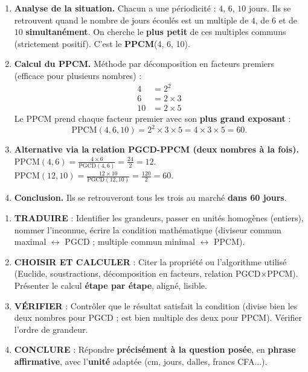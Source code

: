 \documentclass[11pt]{article}
\begin{document}
\begin{enumerate}
\item \textbf{Analyse de la situation.}
Chacun a une périodicité : $4$, $6$, $10$ jours. Ils se retrouvent quand le nombre de jours écoulés est un multiple de $4$, de $6$ et de $10$ \textbf{simultanément}. On cherche le \textbf{plus petit} de ces multiples communs (strictement positif). C'est le \textbf{PPCM}(4, 6, 10).

\item \textbf{Calcul du PPCM.}
Méthode par décomposition en facteurs premiers (efficace pour plusieurs nombres) :
\begin{align*}
4 &= 2^2 \\
6 &= 2 \times 3 \\
10 &= 2 \times 5
\end{align*}
Le PPCM prend chaque facteur premier avec son \textbf{plus grand exposant} :
\[
\text{PPCM}(4,6,10) = 2^2 \times 3 \times 5 = 4 \times 3 \times 5 = 60.
\]

\item \textbf{Alternative via la relation PGCD-PPCM (deux nombres à la fois).}
$\text{PPCM}(4,6) = \frac{4\times6}{\text{PGCD}(4,6)} = \frac{24}{2} = 12$.
$\text{PPCM}(12,10) = \frac{12\times10}{\text{PGCD}(12,10)} = \frac{120}{2} = 60$.

\item \textbf{Conclusion.}
Ils se retrouveront tous les trois au marché \textbf{dans 60 jours}.
\end{enumerate}

\begin{methode}
\begin{enumerate}
\item \textbf{TRADUIRE} : Identifier les grandeurs, passer en unités homogènes (entiers), nommer l'inconnue, écrire la condition mathématique (diviseur commun maximal $\leftrightarrow$ PGCD ; multiple commun minimal $\leftrightarrow$ PPCM).
\item \textbf{CHOISIR ET CALCULER} : Citer la propriété ou l'algorithme utilisé (Euclide, soustractions, décomposition en facteurs, relation PGCD$\times$PPCM). Présenter le calcul \textbf{étape par étape}, aligné, lisible.
\item \textbf{VÉRIFIER} : Contrôler que le résultat satisfait la condition (divise bien les deux nombres pour PGCD ; est bien multiple des deux pour PPCM). Vérifier l'ordre de grandeur.
\item \textbf{CONCLURE} : Répondre \textbf{précisément à la question posée}, en \textbf{phrase affirmative}, avec l'\textbf{unité} adaptée (cm, jours, dalles, francs CFA...).
\end{enumerate}
\end{methode}
\end{document}
